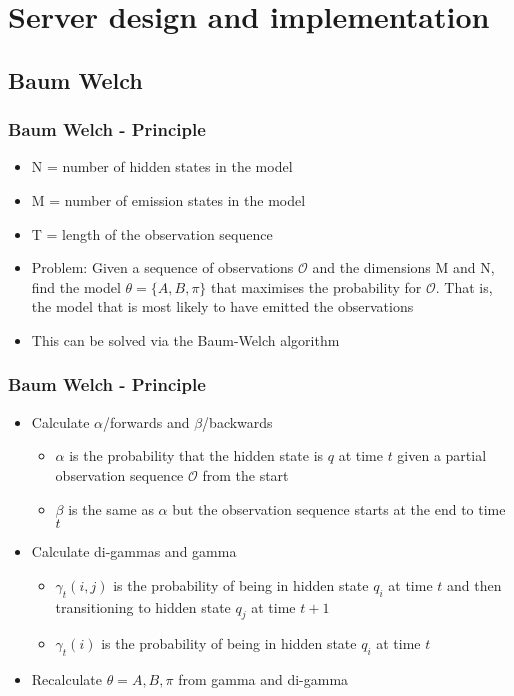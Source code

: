 \section{Server design and implementation}
\lstset{language=HMMLanguage,numbers=left,breaklines=true,numbersep=0pt}
\subsection{Baum Welch}
\begin{frame}
	\frametitle{Baum Welch - Principle}
	\begin{itemize}
		\item N = number of hidden states in the model
		\item M = number of emission states in the model
		\item T = length of the observation sequence
		\item Problem: Given a sequence of observations $\mathcal{O}$ and the dimensions M and N, find the model $\theta = \{A, B, \pi\}$ that maximises the probability for $\mathcal{O}$. That is, the model that is most likely to have emitted the observations
		\item This can be solved via the Baum-Welch algorithm
	\end{itemize}
\end{frame}

\begin{frame}
	\frametitle{Baum Welch - Principle}
	\begin{itemize}
		\item Calculate $\alpha$/forwards and $\beta$/backwards
		\begin{itemize}
			\item $\alpha$ is the probability that the hidden state is $q$ at time $t$ given a partial observation sequence $\mathcal{O}$ from the start
			\item $\beta$ is the same as $\alpha$ but the observation sequence starts at the end to time $t$
		\end{itemize}
		\item Calculate di-gammas and gamma
		\begin{itemize}
			\item $\gamma_t(i,j)$ is the probability of being in hidden state $q_i$ at time $t$ and then transitioning to hidden state $q_j$ at time $t+1$
			\item $\gamma_t(i)$ is the probability of being in hidden state $q_i$ at time $t$
		\end{itemize}
		\item Recalculate $\theta = {A,B,\pi}$ from gamma and di-gamma
	\end{itemize}
\end{frame}

